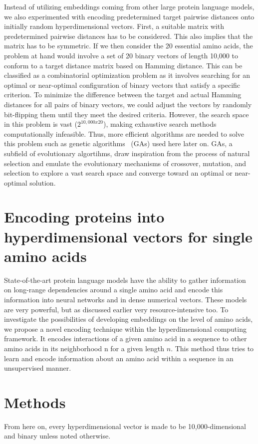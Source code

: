 Instead of utilizing embeddings coming from other large protein language models, we also experimented with encoding predetermined target pairwise distances onto initially random hyperdimensional vectors. First, a suitable matrix with predetermined pairwise distances has to be considered. This also implies that the matrix has to be symmetric. If we then consider the 20 essential amino acids, the problem at hand would involve a set of 20 binary vectors of length 10,000 to conform to a target distance matrix based on Hamming distance. This can be classified as a combinatorial optimization problem as it involves searching for an optimal or near-optimal configuration of binary vectors that satisfy a specific criterion. To minimize the difference between the target and actual Hamming distances for all pairs of binary vectors, we could adjust the vectors by randomly bit-flipping them until they meet the desired criteria. However, the search space in this problem is vast ($2^{10,000 x 20}$), making exhaustive search methods computationally infeasible. Thus, more efficient algorithms are needed to solve this problem such as genetic algorithms~\cite{GA} (GAs) used here later on. GAs, a subfield of evolutionary algortihms, draw inspiration from the process of natural selection and emulate the evolutionary mechanisms of crossover, mutation, and selection to explore a vast search space and converge toward an optimal or near-optimal solution.

\section{Encoding proteins into hyperdimensional vectors for single amino acids}
\label{sec:trans}
State-of-the-art protein language models have the ability to gather information on long-range dependencies around a single amino acid and encode this information into neural networks and in dense numerical vectors. These models are very powerful, but as discussed earlier very resource-intensive too. To investigate the possibilities of developing embeddings on the level of amino acids, we propose a novel encoding technique within the hyperdimensional computing framework. It encodes interactions of a given amino acid in a sequence to other amino acids in its neighborhood n for a given length $n$. This method thus tries to learn and encode information about an amino acid within a sequence in an unsupervised manner.
\section{Methods}
From here on, every hyperdimensional vector is made to be 10,000-dimensional and binary unless noted otherwise. 
